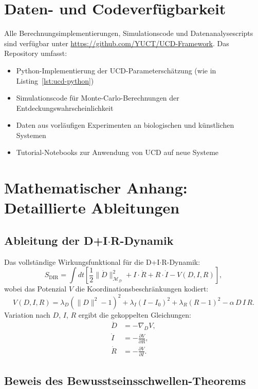 \documentclass[12pt,a4paper]{article}
\newcommand{\Dict}{\mathcal{D}}
\newcommand{\Mdict}{\mathcal{M}_{\Dict}}
\begin{document}
	\section*{Daten- und Codeverfügbarkeit}
	
	Alle Berechnungsimplementierungen, Simulationscode und Datenanalysescripts sind verfügbar unter \url{https://github.com/YUCT/UCD-Framework}. Das Repository umfasst:
	\begin{itemize}
		\item Python-Implementierung der UCD-Parameterschätzung (wie in Listing~\ref{lst:ucd-python})
		\item Simulationscode für Monte-Carlo-Berechnungen der Entdeckungswahrscheinlichkeit
		\item Daten aus vorläufigen Experimenten an biologischen und künstlichen Systemen
		\item Tutorial-Notebooks zur Anwendung von UCD auf neue Systeme
	\end{itemize}
	
	\appendix
	
	\section{Mathematischer Anhang: Detaillierte Ableitungen}
	
	\subsection{Ableitung der D+I\(\cdot\)R-Dynamik}
	
	Das vollständige Wirkungsfunktional für die D+I\(\cdot\)R-Dynamik:
	\[
	S_{\mathrm{DIR}} = \int dt \left[ \frac{1}{2}\|\dot{D}\|^2_{\Mdict} + I \cdot \dot{R} + R \cdot \dot{I} - V(D,I,R) \right],
	\]
	wobei das Potenzial \(V\) die Koordinationsbeschränkungen kodiert:
	\[
	V(D,I,R) = \lambda_D (\|D\|^2 - 1)^2 + \lambda_I (I - I_0)^2 + \lambda_R (R - 1)^2 - \alpha\, D\,I\,R.
	\]
	Variation nach \(D\), \(I\), \(R\) ergibt die gekoppelten Gleichungen:
	\begin{align*}
		\ddot{D} &= -\nabla_D V, \\
		\dot{I}  &= -\frac{\partial V}{\partial R}, \\
		\dot{R}  &= -\frac{\partial V}{\partial I}.
	\end{align*}
	
	\subsection{Beweis des Bewusstseinsschwellen-Theorems}
	
\end{document}
